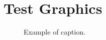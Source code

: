 \documentclass[10pt]{article}
\begin{document}
\section{Test Graphics}

\def\FigSize{.1}

\begin{figure}[ht!]
\begin{center}
\fbox{\rule{0pt}{2in} \rule{\FigSize \linewidth}{0pt}} %
\end{center}
   \caption{Example of caption.}
\label{fig:SingleFigure1}
\end{figure}
\end{document}

